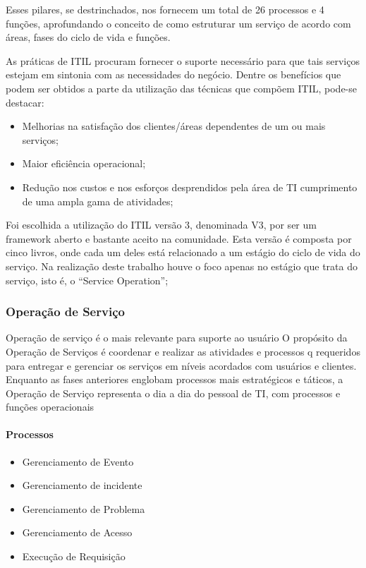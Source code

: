 Esses pilares, se destrinchados, nos fornecem um total de 26 processos e 4
funções, aprofundando o conceito de como estruturar um serviço de acordo com
áreas, fases do ciclo de vida e funções.



As práticas de ITIL procuram fornecer o suporte necessário para
que tais serviços estejam em sintonia com as necessidades do
negócio\cite{cartlidge2007introductory}. Dentre os benefícios que podem ser
obtidos a parte da utilização das técnicas que compõem ITIL, pode-se destacar:


\begin{itemize}[noitemsep]
	\item Melhorias na satisfação dos clientes/áreas dependentes de um ou mais serviços;
	\item Maior eficiência operacional;
	\item Redução nos custos e nos esforços desprendidos pela área de TI
    cumprimento de uma ampla gama de atividades;
\end{itemize}

Foi escolhida a utilização do ITIL versão 3, denominada
V3, por ser um framework aberto e bastante aceito na comunidade. Esta versão é
composta por cinco livros, onde cada um deles está relacionado a um estágio do
ciclo de vida do serviço. Na realização deste trabalho houve o foco apenas no
estágio que trata do serviço, isto é, o “Service Operation”;\\

\subsubsection{Operação de Serviço}
Operação de serviço é o mais relevante para suporte ao usuário
O propósito da Operação de Serviços é coordenar e realizar as atividades e processos q
requeridos para entregar e gerenciar os serviços em níveis acordados com usuários e
clientes. Enquanto as fases anteriores englobam processos mais estratégicos e táticos,
a Operação de Serviço representa o dia a dia do pessoal de TI, com processos e
funções operacionais

\paragraph{Processos}
\begin{itemize}[noitemsep]
	\item Gerenciamento de Evento
	\item Gerenciamento de incidente
	\item Gerenciamento de Problema
	\item Gerenciamento de Acesso
	\item Execução de Requisição
\end{itemize}

